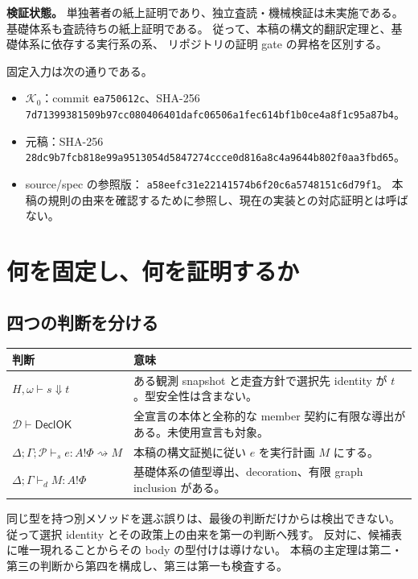 \documentclass[11pt,a4paper]{article}
\newcommand{\Core}{\mathcal K}
\newcommand{\Ctx}{\Delta;\Gamma;\mathcal P}
\newcommand{\Ty}{\mathrel{\vdash_d}}
\begin{document}
\textbf{検証状態。}
単独著者の紙上証明であり、独立査読・機械検証は未実施である。
基礎体系も査読待ちの紙上証明である。
従って、本稿の構文的翻訳定理と、基礎体系に依存する実行系の系、
リポジトリの証明 gate の昇格を区別する。

固定入力は次の通りである。
\begin{itemize}
\item \(\Core_0\)：commit \texttt{ea750612c}、SHA-256
\nolinkurl{7d71399381509b97cc080406401dafc06506a1fec614bf1b0ce4a8f1c95a87b4}。
\item 元稿：SHA-256
\nolinkurl{28dc9b7fcb818e99a9513054d5847274ccce0d816a8c4a9644b802f0aa3fbd65}。
\item source/spec の参照版：
\nolinkurl{a58eefc31e22141574b6f20c6a5748151c6d79f1}。
本稿の規則の由来を確認するために参照し、現在の実装との対応証明とは呼ばない。
\end{itemize}

\tableofcontents

\section{何を固定し、何を証明するか}

\subsection{四つの判断を分ける}

\begin{longtable}{p{}p{}}
\toprule 判断 & 意味 \\
\midrule\endhead
\(H,\omega\vdash s\Downarrow t\) & ある観測 snapshot と走査方針で選択先 identity が \(t\)。型安全性は含まない。\\
\(\mathcal D\vdash\mathsf{DeclOK}\) & 全宣言の本体と全称的な member 契約に有限な導出がある。未使用宣言も対象。\\
\(\Ctx\vdash_s e:A!\Phi\rightsquigarrow M\) & 本稿の構文証拠に従い \(e\) を実行計画 \(M\) にする。\\
\(\Delta;\Gamma\Ty M:A!\Phi\) & 基礎体系の値型導出、decoration、有限 graph inclusion がある。\\
\bottomrule
\end{longtable}

同じ型を持つ別メソッドを選ぶ誤りは、最後の判断だけからは検出できない。
従って選択 identity とその政策上の由来を第一の判断へ残す。
反対に、候補表に唯一現れることからその body の型付けは導けない。
本稿の主定理は第二・第三の判断から第四を構成し、第三は第一も検査する。
\end{document}
